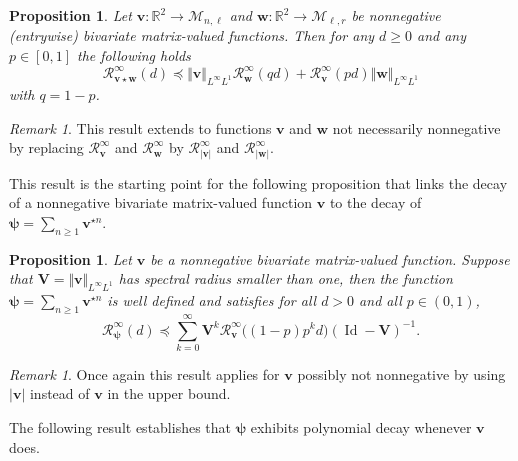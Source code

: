 \documentclass[reqno,final,11pt]{amsart}
\theoremstyle{plain}
\newtheorem{proposition}[theorem]{Proposition}
\theoremstyle{definition}
\theoremstyle{remark}
\newtheorem{remark}[theorem]{Remark}
\newcommand{\R}{\mathds{R}}
\newcommand{\Vityone}[1]{\Vert #1 \Vert_{L^{\infty}L^{1}}}
\newcommand{\Res}{\mathcal{R}}
\DeclareMathOperator{\Id}{Id}
\begin{document}
\begin{proposition}\label{prop4.2.0}
	Let $\bm{v}:\R^2 \to \mathcal{M}_{n,\ell}$ and $\bm{w} : \R^2 \to \mathcal{M}_{\ell,r}$ be nonnegative (entrywise) bivariate matrix-valued functions. Then for any $d\geq 0$ and any $p\in[0,1]$ the following holds
	\begin{equation}\label{eq4.1}
	\Res^{\infty}_{\bm{v}\star\bm{w}}(d) \preceq \Vityone{\bm{v}}  \Res^{\infty}_{\bm{w}}(qd) + \Res^{\infty}_{\bm{v}}(pd)  \Vityone{\bm{w}}
\end{equation}
with $q=1-p$.
\end{proposition}

\begin{remark}
	This result extends to functions $\bm{v}$ and $\bm{w}$ not necessarily nonnegative by replacing $\Res^{\infty}_{\bm{v}}$ and $\Res^{\infty}_{\bm{w}}$ by $\Res^{\infty}_{\vert\bm{v}\vert}$ and $\Res^{\infty}_{\vert\bm{w}\vert}$.
\end{remark}

This result is the starting point for the following proposition that links the decay of a nonnegative bivariate matrix-valued function $\bm{v}$ to the decay of $\bm{\psi} = \sum_{n\geq 1} \bm{v}^{\star n}$.

\begin{proposition}\label{prop4.2}
	Let $\bm{v}$ be a nonnegative bivariate matrix-valued function. Suppose that $\bm{V} =\Vityone{\bm{v}}$ has spectral radius smaller than one, then the function $\bm{\psi} = \sum_{n\geq 1} \bm{v}^{\star n}$ is well defined and satisfies for all $d>0$ and all $p\in(0,1)$,
	\[\Res_{\bm{\psi}}^{\infty}(d) \preceq \sum_{k=0}^{\infty} \bm{V}^k \Res_{\bm{v}}^{\infty}\big((1-p)p^k d\big) (\Id-\bm{V})^{-1}. \]  
\end{proposition}

\begin{remark}
	Once again this result applies for $\bm{v}$ possibly not nonnegative by using $\vert \bm{v}\vert$ instead of $\bm{v}$ in the upper bound.
\end{remark}

The following result establishes that $\bm{\psi}$ exhibits polynomial decay whenever $\bm{v}$ does.
\end{document}
